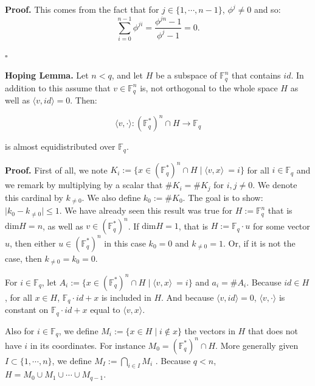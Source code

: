 \documentclass{article}
\begin{document}
\vspace{0.3cm}

\textbf{Proof.}
This comes from the fact that for $j \in \{1,\cdots,n-1\}$, $\phi^j \neq 0$ and so:
\[
\sum_{i=0}^{n-1} \phi^{ji} = \frac{\phi^{jn} -1}{\phi^j - 1} = 0.
\]

\hfill $\square$

\vspace{0.3 cm}

\textbf{Hoping Lemma.}
Let $n < q$, and let $H$ be a subspace of $\mathbb{F}_q^n$ that contains $id$. In addition to this assume that $v \in \mathbb{F}_q^n$ is, not orthogonal to the whole space $H$ as well as $\langle v, id\rangle = 0$. Then:

\[
\langle v, \cdot \rangle : (\mathbb{F}_q^*)^n \cap H \to \mathbb{F}_q
\] 

is almost equidistributed over $\mathbb{F}_q$.

\vspace{0.3cm}

\textbf{Proof.}
First of all, we note $K_i:=\{x\in (\mathbb{F}_q^*)^n \cap H \mid \langle v, x\rangle\ = i\}$ for all $i \in \mathbb{F}_q$ and we remark by multiplying by a scalar that $\#K_i = \#K_j$ for $i,j \neq 0$. We denote this cardinal by $k_{\neq0}$. We also define $k_0:=\#K_0$. The goal is to show: $\mid k_0 - k_{\neq 0}\mid \leq 1$. We have already seen this result was true for $H:=\mathbb{F}_q^n$ that is $\text{dim}H = n$, as well as $v\in (\mathbb{F}_q^*)^n$. If $\text{dim}H = 1$, that is $H:= \mathbb{F}_q \cdot u$ for some vector $u$, then either $u \in (\mathbb{F}_q^*)^n$ in this case $k_0 = 0$ and $k_{\neq 0} = 1$. Or, if it is not the case, then $k_{\neq 0} = k_0= 0$.

\vspace{0.3cm}

For $i \in \mathbb{F}_q$, let $A_i:= \{x\in (\mathbb{F}_q^*)^n \cap H \mid \langle v, x\rangle\ = i\}$ and $a_i = \#A_i$. Because $id \in H$, for all $x \in H$,  $ \mathbb{F}_q \cdot id + x$ is included in $H$. And because $\langle v, id\rangle = 0$, $\langle v, \cdot\rangle$ is constant on $ \mathbb{F}_q \cdot id + x$ equal to $\langle v, x\rangle$.

\vspace{0.3cm}

Also for $i \in \mathbb{F}_q$, we define $M_i := \{x\in H \mid i \notin x \}$ the vectors in $H$ that does not have $i$ in its coordinates. For instance $M_0 = (\mathbb{F}_q^*)^n \cap H$. More generally given $I \subset \{1,\cdots,n\}$, we define $M_I:= \bigcap_{i \in I} M_i$ . Because $q < n$, $H= M_0 \cup M_1 \cup \cdots \cup M_{q-1}$. 
\end{document}
